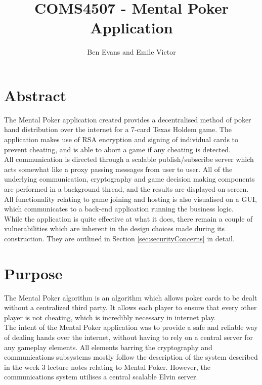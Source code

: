 \documentclass[11pt, oneside]{article}   	%
\title{COMS4507 - Mental Poker Application}
\author{Ben Evans and Emile Victor}
\begin{document}
\maketitle

\section{Abstract}

The Mental Poker application created provides a decentralised method of poker hand distribution over the internet for a 7-card Texas Holdem game. The application makes use of RSA encryption and signing of individual cards to prevent cheating, and is able to abort a game if any cheating is detected.\\
					
All communication is directed through a scalable publish/subscribe server which acts somewhat like a proxy passing messages from user to user. All of the underlying communication, cryptography and game decision making components are performed in a background thread, and the results are displayed on screen. All functionality relating to game joining and hosting is also visualised on a GUI, which communicates to a back-end application running the business logic.\\
					
While the application is quite effective at what it does, there remain a couple of vulnerabilities which are inherent in the design choices made during its construction. They are outlined in Section \ref{sec:securityConcerns} in detail.

\section {Purpose}

The Mental Poker algorithm is an algorithm which allows poker cards to be dealt without a centralized third party. It allows each player to ensure that every other player is not cheating, which is incredibly necessary in internet play. \\

The intent of the Mental Poker application was to provide a safe and reliable way of dealing hands over the internet, without having to rely on a central server for any gameplay elements. All elements barring the cryptography and communications subsystems mostly follow the description of the system described in the week 3 lecture notes relating to Mental Poker. However, the communications system utilises a central scalable Elvin server.\\
\end{document}
